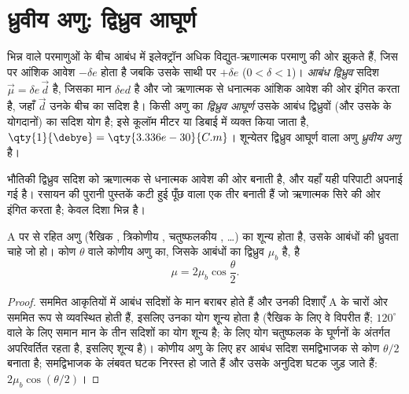 \section{ध्रुवीय अणु: द्विध्रुव आघूर्ण}

\begin{definition}[आबंध द्विध्रुव, द्विध्रुव आघूर्ण]\label{def:b1:lewis-resonance-vsepr:dipole}
भिन्न  वाले परमाणुओं के बीच आबंध में इलेक्ट्रॉन
अधिक विद्युत-ऋणात्मक परमाणु की ओर झुकते हैं, जिस पर आंशिक आवेश
$-\delta e$ होता है जबकि उसके साथी पर $+\delta e$ ($0 < \delta < 1$)।
\emph{आबंध द्विध्रुव} सदिश $\vec\mu = \delta e\,
\vec d$ है, जिसका मान $\delta e d$ है और जो ऋणात्मक से धनात्मक
आंशिक आवेश की ओर इंगित करता है, जहाँ $\vec d$ उनके बीच का सदिश है। किसी अणु का
\emph{द्विध्रुव आघूर्ण} उसके आबंध द्विध्रुवों (और उसके
 के योगदानों) का सदिश योग है; इसे
कूलॉम मीटर या डिबाई में व्यक्त किया जाता है, $\qty{1}{\debye} =
\qty{3.336e-30}{C.m}$। शून्येतर द्विध्रुव आघूर्ण वाला अणु
\emph{ध्रुवीय अणु} है।
\end{definition}

\begin{remark}[दिशा की परिपाटी]\label{rem:b1:lewis-resonance-vsepr:convention}
भौतिकी द्विध्रुव सदिश को ऋणात्मक से धनात्मक आवेश की ओर बनाती है,
और यहाँ यही परिपाटी अपनाई गई है। रसायन की पुरानी पुस्तकें कटी हुई पूँछ वाला एक तीर
बनाती हैं जो ऋणात्मक सिरे की ओर इंगित करता है; केवल
दिशा भिन्न है।
\end{remark}

\begin{proposition}[सममित अणु का द्विध्रुव]\label{prop:b1:lewis-resonance-vsepr:dipole-sum}
A पर  से रहित अणु  (रैखिक , त्रिकोणीय
, चतुष्फलकीय , \dots) का  शून्य होता है, उसके
आबंधों की ध्रुवता चाहे जो हो। कोण $\theta$ वाले कोणीय  अणु का,
जिसके आबंधों का द्विध्रुव $\mu_b$ है,  है
\[
  \mu = 2\mu_b \cos\frac{\theta}{2} .
\]
\end{proposition}

\begin{proof}
सममित आकृतियों में आबंध सदिशों के मान बराबर होते हैं और उनकी
दिशाएँ A के चारों ओर सममित रूप से व्यवस्थित होती हैं, इसलिए उनका योग शून्य होता है
(रैखिक  के लिए वे विपरीत हैं; $120^\circ$ वाले  के लिए
समान मान के तीन सदिशों का योग शून्य है;  के लिए योग
चतुष्फलक के घूर्णनों के अंतर्गत अपरिवर्तित रहता है, इसलिए शून्य है)। कोणीय
अणु के लिए हर आबंध सदिश समद्विभाजक से कोण $\theta/2$ बनाता है;
समद्विभाजक के लंबवत घटक निरस्त हो जाते हैं और उसके अनुदिश घटक
जुड़ जाते हैं: $2\mu_b\cos(\theta/2)$।
\end{proof}

